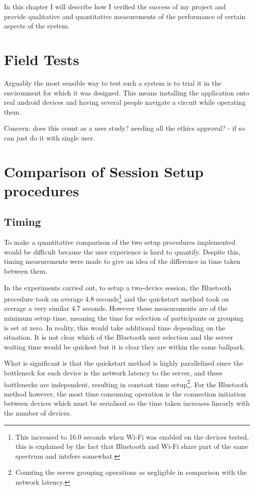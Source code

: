 In this chapter I will describe how I verified the success of my project and provide qualitative and quantitative measurements of  the performance of certain aspects of the system.

\section{Field Tests}

Arguably the most sensible way to test such a system is to trial it in the environment for which it was designed. This means installing the application onto real android devices and having several people navigate a circuit while operating them.

Concern: does this count as a user study? needing all the ethics approval? - if so can just do it with single user.

\section{Comparison of Session Setup procedures}

\subsection{Timing}
\label{setupEval}
To make a quantitative comparison of the two setup procedures implemented would be difficult because the user experience is hard to quantify. Despite this, timing measurements were made to give an idea of the difference in time taken between them.

In the experiments carried out, to setup a two-device session, the Bluetooth procedure took on average 4.8 seconds\footnote{This increased to 16.0 seconds when Wi-Fi was enabled on the devices tested, this is explained by the fact that Bluetooth and Wi-Fi share part of the same spectrum and intrfere somewhat.\cite{btWi-Fi}} and the quickstart method took on average a very similar 4.7 seconds. However these measurements are of the minimum setup time, meaning the time for selection of participants or grouping is set at zero. In reality, this would take additional time depending on the situation. It is not clear which of the Bluetooth user selection and the server waiting time would be quickest but it is clear they are within the same ballpark.

What is significant is that the quickstart method is highly parallelized since the bottleneck for each device is the network latency to the server, and these bottlenecks are independent, resulting in constant time setup\footnote{Counting the server grouping operations as negligible in comparison with the network latency.}. For the Bluetooth method however, the most time consuming operation is the connection initiation between devices which must be serialised so the time taken increases linearly with the number of devices.

